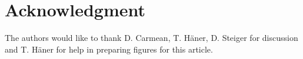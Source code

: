 \documentclass[journal]{IEEEtran}
\begin{document}
\section*{Acknowledgment}


The authors would like to thank D. Carmean, T. H\"aner, D. Steiger for discussion and T. H\"aner for help in preparing figures for this article.


\ifCLASSOPTIONcaptionsoff
  \newpage
\fi





%
%
%


% 









\end{document}
